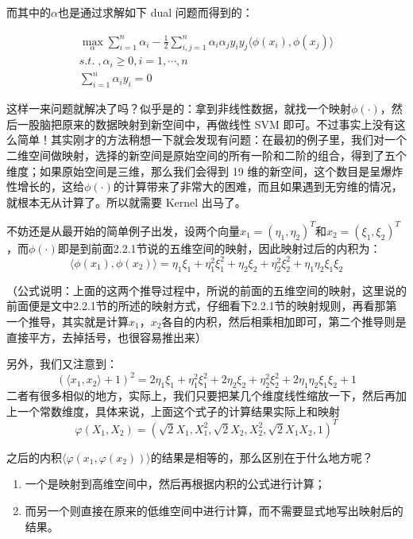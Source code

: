 \documentclass[a4paper,12pt]{article}
\begin{document}
而其中的$\alpha$也是通过求解如下 dual 问题而得到的：

\begin{equation}
  \begin{split}
    \max_\alpha\sum_{i=1}^n\alpha_i-\frac{1}{2}\sum_{i,j=1}^n\alpha_i\alpha_jy_iy_j\langle\phi(x_i),\phi(x_j)\rangle\\
    s.t.\;,\alpha_i\geq0,i=1,\cdots,n\\
    \sum_{i=1}^n\alpha_iy_i=0
  \end{split}
\end{equation}

这样一来问题就解决了吗？似乎是的：拿到非线性数据，就找一个映射$\phi(\cdot)$，然后一股脑把原来的数据映射到新空间中，再做线性 SVM 即可。不过事实上没有这么简单！其实刚才的方法稍想一下就会发现有问题：在最初的例子里，我们对一个二维空间做映射，选择的新空间是原始空间的所有一阶和二阶的组合，得到了五个维度；如果原始空间是三维，那么我们会得到 19 维的新空间，这个数目是呈爆炸性增长的，这给$\phi(\cdot)$的计算带来了非常大的困难，而且如果遇到无穷维的情况，就根本无从计算了。所以就需要 Kernel 出马了。

不妨还是从最开始的简单例子出发，设两个向量$x_1=(\eta_1,\eta_2)^T$和$x_2=(\xi_1,\xi_2)^T$，而$\phi(\cdot)$即是到前面2.2.1节说的五维空间的映射，因此映射过后的内积为：
\begin{equation}
  \langle\phi(x_1),\phi(x_2)\rangle=\eta_1\xi_1+\eta_1^2\xi_1^2+\eta_2\xi_2+\eta_2^2\xi_2^2+\eta_1\eta_2\xi_1\xi_2
\end{equation}

（公式说明：上面的这两个推导过程中，所说的前面的五维空间的映射，这里说的前面便是文中2.2.1节的所述的映射方式，仔细看下2.2.1节的映射规则，再看那第一个推导，其实就是计算$x_1$，$x_2$各自的内积，然后相乘相加即可，第二个推导则是直接平方，去掉括号，也很容易推出来）

另外，我们又注意到：
\begin{equation}
  (\langle x_1,x_2\rangle+1)^2=2\eta_1\xi_1+\eta_1^2\xi_1^2+2\eta_2\xi_2+\eta_2^2\xi_2^2+2\eta_1\eta_2\xi_1\xi_2+1
\end{equation}
 二者有很多相似的地方，实际上，我们只要把某几个维度线性缩放一下，然后再加上一个常数维度，具体来说，上面这个式子的计算结果实际上和映射
 \begin{equation}
   \varphi(X_1,X_2)=(\sqrt{2}X_1,X_1^2,\sqrt{2}X_2,X_2^2,\sqrt{2}X_1X_2,1)^T
 \end{equation}

 之后的内积$\langle\varphi(x_1,\varphi(x_2))\rangle$的结果是相等的，那么区别在于什么地方呢？
 \begin{enumerate}[1.~]
   \item 一个是映射到高维空间中，然后再根据内积的公式进行计算；
   \item 而另一个则直接在原来的低维空间中进行计算，而不需要显式地写出映射后的结果。
 \end{enumerate}
\end{document}
